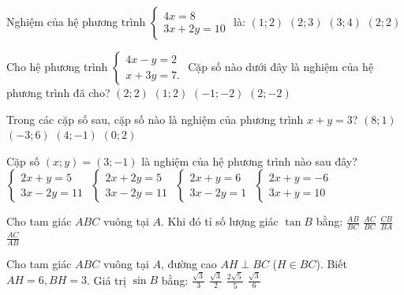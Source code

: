\documentclass[12pt,a4paper]{article}
\begin{document}
\begin{ex}
Nghiệm của hệ phương trình $\begin{cases} 4x = 8 \\ 3x + 2y = 10 \end{cases}$ là:
\choice
{$(1; 2)$}
{$(2; 3)$}
{$(3; 4)$}
{\True $(2; 2)$}
\end{ex}

\begin{ex}
Cho hệ phương trình $\begin{cases} 4x - y = 2 \\ x + 3y = 7. \end{cases}$ Cặp số nào dưới đây là nghiệm của hệ phương trình đã cho?
\choice
{$(2; 2)$}
{\True $(1; 2)$}
{$(-1; -2)$}
{$(2; -2)$}
\end{ex}

\begin{ex}
Trong các cặp số sau, cặp số nào là nghiệm của phương trình $x + y = 3$?
\choice
{$(8; 1)$}
{$(-3; 6)$}
{\True $(4; -1)$}
{$(0; 2)$}
\end{ex}

\begin{ex}
Cặp số $(x; y) = (3; -1)$ là nghiệm của hệ phương trình nào sau đây?
\choice
{\True $\begin{cases} 2x + y = 5 \\ 3x - 2y = 11 \end{cases}$}
{$\begin{cases} 2x + 2y = 5 \\ 3x - 2y = 11 \end{cases}$}
{$\begin{cases} 2x + y = 6 \\ 3x - 2y = 1 \end{cases}$}
{$\begin{cases} 2x + y = -6 \\ 3x + y = 10 \end{cases}$}
\end{ex}

\begin{ex}
Cho tam giác $ABC$ vuông tại $A$. Khi đó tỉ số lượng giác $\tan B$ bằng:
\choice
{$\frac{AB}{BC}$}
{$\frac{AC}{BC}$}
{$\frac{CB}{BA}$}
{\True $\frac{AC}{AB}$}
\end{ex}

\begin{ex}
Cho tam giác $ABC$ vuông tại $A$, đường cao $AH \perp BC$ ($H \in BC$). Biết $AH = 6, BH = 3$. Giá trị $\sin B$ bằng:
\choice
{$\frac{\sqrt{3}}{3}$}
{$\frac{\sqrt{3}}{2}$}
{\True $\frac{2\sqrt{5}}{5}$}
{$\frac{\sqrt{3}}{6}$}
\end{ex}
\end{document}
